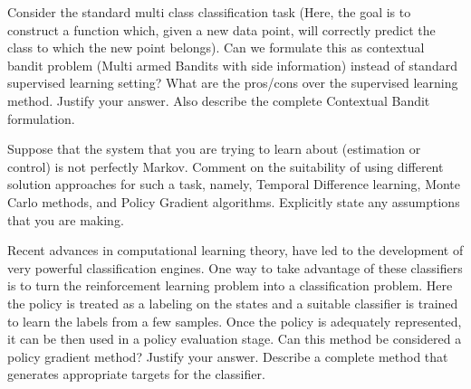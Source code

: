 \documentclass[addpoints,12pt,solution]{exam}
\begin{document}
\begin{questions}
\begin{enumerate}[label=(\alph*)]
\end{enumerate}

 Consider the standard multi class classification task (Here, the goal is to construct a function which, given a new data point, will correctly predict the class to which the new point belongs). Can we formulate this as contextual bandit problem (Multi armed Bandits with side information) instead of standard supervised learning setting? What are the pros/cons over the supervised learning method. Justify your answer. Also describe the complete Contextual Bandit formulation.

\begin{solution}

\end{solution}

\question[5] [TD, MC, PG] Suppose that the system that you are trying to learn about (estimation or control) is not perfectly Markov. Comment on the suitability of using different solution approaches for such a task, namely, Temporal Difference learning, Monte Carlo methods, and Policy Gradient algorithms. Explicitly state any assumptions that you are making.
\begin{solution}

\end{solution}

\question[5] [PG] Recent advances in computational learning theory, have led to the development of very powerful classification engines. One way to take advantage of these classifiers is to turn the reinforcement learning problem into a classification problem. Here the policy is treated as a labeling on the states and a suitable classifier is trained to learn the labels from a few samples. Once the policy is adequately represented, it can be then used in a policy evaluation stage. Can this method be considered a policy gradient method? Justify your answer. Describe a complete method that generates appropriate targets for the classifier.
\begin{solution}

\end{solution}

\end{questions}
\end{document}
